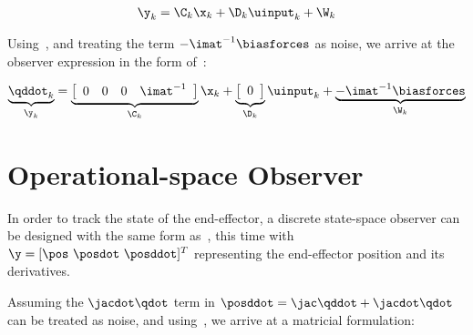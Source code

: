 \begin{gather}
  \y_k = \C_k\x_k + \D_k \uinput_k + \W_k \label{eqn:ss_discrete_observer}
\end{gather}

Using~, and treating the term $-\imat^{-1}\biasforces$
as noise, we arrive at the observer expression in the form of~:

\begin{gather}
  \underbrace{\qddot_k}_{\y_k} = \underbrace{\left[ \begin{array}{cccc} 0&0&0&\imat^{-1}\end{array}\right]}_{\C_k}
  \x_k +
  \underbrace{\left[ \begin{array}{c} 0\end{array}\right]}_{\D_k}
  \uinput_k +
  \underbrace{-\imat^{-1}\biasforces}_{\W_k}
 \label{eqn:ss_joint_acceleration_observer}
\end{gather}



\section{Operational-space Observer}
In order to track the state of the end-effector, a discrete state-space observer
can be designed with the same form as~, this time with $\y = [\pos\ \posdot\ \posddot]^T$ representing the end-effector position
and its derivatives.

Assuming the $\jacdot\qdot$ term in $\posddot=\jac \qddot + \jacdot \qdot$ can
be treated as noise, and using~, we arrive at a matricial formulation:

